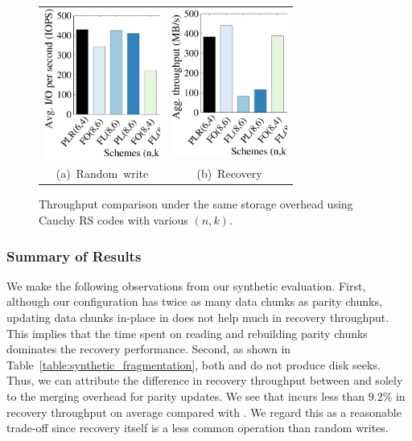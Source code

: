\begin{figure}[!t]
\centering
\begin{tabular}{c@{\ }c}
\includegraphics[width=1.5in]{charts/reserve_overhead/eps/reserve_overhead_randw} & 
\includegraphics[width=1.5in]{charts/reserve_overhead/eps/reserve_overhead_recover}
\vspace{-3pt}\\
\mbox{\small (a) Random write} &
\mbox{\small (b) Recovery}
\end{tabular}
\vspace{-3pt}
\caption{Throughput comparison under the same storage
 overhead using Cauchy RS codes with various $(n,k)$.}
\label{fig:reserve_comparison}
\vspace{-6pt}
\end{figure}

\subsubsection{Summary of Results}

We make the following observations from our synthetic evaluation.
First, although our configuration has twice as many data chunks as
parity chunks, updating data chunks in-place in \PL does not help much in
recovery throughput.  This implies that the time spent on reading and
rebuilding parity chunks dominates the recovery performance.  Second, as shown
in Table~\ref{table:synthetic_fragmentation}, both \FO and \PLR do not
produce disk seeks. Thus, we can attribute the difference in recovery
throughput between \FO and \PLR solely to the merging overhead for parity
updates. We see that \PLR incurs less than ${9.2\%}$ in recovery
throughput on average compared with \FO. We regard this as a reasonable
trade-off since recovery itself is a less common operation than random writes.

